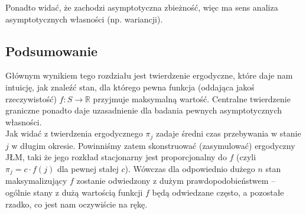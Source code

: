 \documentclass[a4paper]{article}
\theoremstyle{defn}
\theoremstyle{theorem}
\theoremstyle{lemma}
\theoremstyle{cor}
\theoremstyle{fact}
\begin{document}
Ponadto widać, że zachodzi asymptotyczna zbieżność, więc ma sens analiza asymptotycznych własności (np. wariancji).
\subsection{Podsumowanie}
\label{sect2.7}
Głównym wynikiem tego rozdziału jest twierdzenie ergodyczne, które daje nam intuicję, jak znaleźć stan, dla którego pewna funkcja (oddająca jakoś rzeczywistość) $f: S \rightarrow \mathbb{R}$ przyjmuje maksymalną wartość. Centralne twierdzenie graniczne ponadto daje uzasadnienie dla badania pewnych asymptotycznych własności.\\

Jak widać z twierdzenia ergodycznego $\pi_j$ zadaje średni czas przebywania w stanie $j$ w długim okresie. Powinniśmy zatem skonstruować (zasymulować) ergodyczny JŁM, taki że jego rozkład stacjonarny jest proporcjonalny do $f$ (czyli $\pi_j = c \cdot f(j)$ dla pewnej stałej $c$). Wówczas dla odpowiednio dużego $n$ stan maksymalizujący $f$ zostanie odwiedzony z dużym prawdopodobieństwem – ogólnie stany z dużą wartością funkcji $f$ będą odwiedzane często, a pozostałe rzadko, co jest nam oczywiście na rękę.
\\
\end{document}
